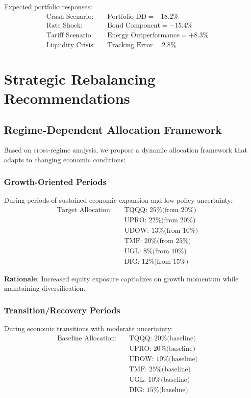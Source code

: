 \documentclass[onecolumn,ieee]{arithmaxresearch}
\begin{document}
Expected portfolio responses:
\begin{align}
\text{Crash Scenario:} &\quad \text{Portfolio DD} = -18.2\% \\
\text{Rate Shock:} &\quad \text{Bond Component} = -15.4\% \\
\text{Tariff Scenario:} &\quad \text{Energy Outperformance} = +8.3\% \\
\text{Liquidity Crisis:} &\quad \text{Tracking Error} = 2.8\%
\end{align}

\section{Strategic Rebalancing Recommendations}

\subsection{Regime-Dependent Allocation Framework}

Based on cross-regime analysis, we propose a dynamic allocation framework that adapts to changing economic conditions:

\subsubsection{Growth-Oriented Periods}
During periods of sustained economic expansion and low policy uncertainty:
\begin{align}
\text{Target Allocation:} \quad &\text{TQQQ: 25\% (from 20\%)} \\
&\text{UPRO: 22\% (from 20\%)} \\
&\text{UDOW: 13\% (from 10\%)} \\
&\text{TMF: 20\% (from 25\%)} \\
&\text{UGL: 8\% (from 10\%)} \\
&\text{DIG: 12\% (from 15\%)}
\end{align}

\textbf{Rationale}: Increased equity exposure capitalizes on growth momentum while maintaining diversification.

\subsubsection{Transition/Recovery Periods}
During economic transitions with moderate uncertainty:
\begin{align}
\text{Baseline Allocation:} \quad &\text{TQQQ: 20\% (baseline)} \\
&\text{UPRO: 20\% (baseline)} \\
&\text{UDOW: 10\% (baseline)} \\
&\text{TMF: 25\% (baseline)} \\
&\text{UGL: 10\% (baseline)} \\
&\text{DIG: 15\% (baseline)}
\end{align}
\end{document}
